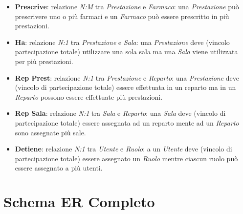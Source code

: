 \documentclass[paper=a4, fontsize=11pt,x11names]{report}
\begin{document}
\begin{itemize}
\item \textbf{Prescrive}: relazione \textit{N:M} tra \textit{Prestazione} e \textit{Farmaco}: una \textit{Prestazione} può prescrivere uno o più farmaci e un \textit{Farmaco} può essere prescritto in più prestazioni.
\item \textbf{Ha}: relazione \textit{N:1} tra \textit{Prestazione} e \textit{Sala}: una \textit{Prestazione} deve (vincolo partecipazione totale) utilizzare una sola sala ma una \textit{Sala} viene utilizzata per più prestazioni.
\item \textbf{Rep Prest}: relazione \textit{N:1} tra \textit{Prestazione} e \textit{Reparto}: una \textit{Prestazione} deve (vincolo di partecipazione totale) essere effettuata in un reparto ma in un \textit{Reparto} possono essere effettuate più prestazioni.
\item \textbf{Rep Sala}: relazione \textit{N:1} tra \textit{Sala} e \textit{Reparto}: una \textit{Sala} deve (vincolo di partecipazione totale) essere assegnata ad un reparto mente ad un \textit{Reparto} sono assegnate più sale. 
\item \textbf{Detiene}: relazione \textit{N:1} tra \textit{Utente} e \textit{Ruolo}: a un \textit{Utente} deve (vincolo di partecipazione totale) essere assegnato un \textit{Ruolo} mentre ciascun ruolo può essere assegnato a più utenti. 
\end{itemize}


\section{Schema ER Completo}
\end{document}
